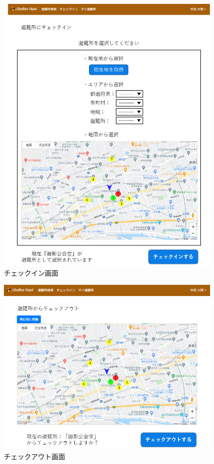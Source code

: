 \documentclass[technicalreport,dvipdfmx]{ieicej}
\begin{document}
\begin{figure}[t]
     \begin{center}
          \includegraphics[scale=0.6,pagebox=cropbox,clip]{img/checkin.png}
          \caption{チェックイン画面}
          \label{fig:checkin}
     \end{center}
\end{figure}

\begin{figure}[t]
     \begin{center}
          \includegraphics[scale=0.6,pagebox=cropbox,clip]{img/checkout.png}
          \caption{チェックアウト画面}
          \label{fig:checkout}
     \end{center}
\end{figure}
\end{document}
